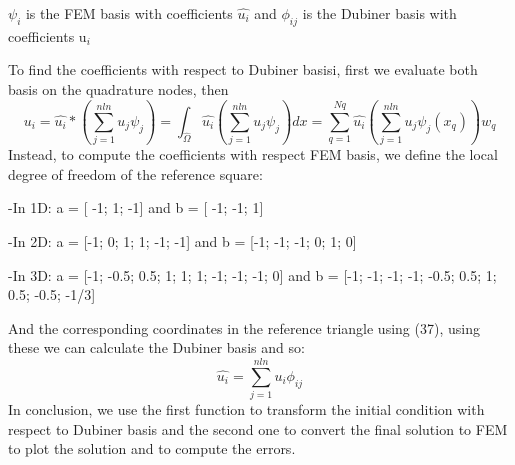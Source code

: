 \documentclass[a4paper]{article}
\theoremstyle{definition}
\begin{document}
	${\psi_{i}}$ is the FEM basis with coefficients $\hat{u_{i}}$ and ${\phi_{ij}}$ is the Dubiner basis with coefficients u$_i$
	
	To find the coefficients with respect to Dubiner basisi, first we evaluate both basis on the quadrature nodes, then
	\begin{equation}
	u_i=\hat{u_i} * (\sum_{j=1}^{nln} u_j \psi_j)=\int_{\hat{\Omega}} \hat{u_i} (\sum_{j=1}^{nln} u_j \psi_j) dx=\sum_{q=1}^{Nq} \hat{u_i} (\sum_{j=1}^{nln} u_j \psi_j(x_q)) w_q
	\end{equation}
	Instead, to compute the coefficients with respect FEM basis, we define the local degree of freedom of the reference square:
	
	-In 1D: a = [ -1; 1; -1] and b = [ -1; -1; 1]
	
	-In 2D: a = [-1; 0; 1; 1; -1; -1] and b = [-1; -1; -1; 0; 1; 0]
	
	-In 3D: a = [-1; -0.5; 0.5; 1; 1; 1; -1; -1; -1; 0] and b = [-1; -1; -1; -1; -0.5; 0.5; 1; 0.5; -0.5; -1/3]
	
	And the corresponding coordinates in the reference triangle using (37), using these we can calculate the Dubiner basis and so:
	\begin{equation}
	\hat{u_i}=\sum_{j=1}^{nln} u_i \phi_{ij}
	\end{equation}
	In conclusion, we use the first function to transform the initial condition with respect to Dubiner basis and the second one to convert the final solution to FEM to plot the solution and to compute the errors. 
\end{document}

